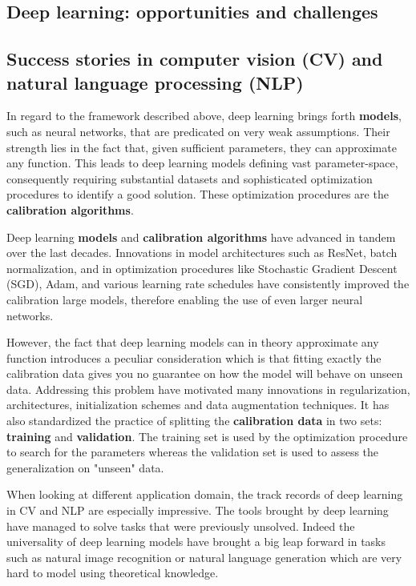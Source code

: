 \begin{bibunit}
% 

\section{Deep learning: opportunities and challenges}

\subsection{Success stories in computer vision (CV) and natural language processing (NLP)}

In regard to the framework described above, deep learning brings forth \textbf{models}, such as neural networks, that are predicated on very weak assumptions. Their strength lies in the fact that, given sufficient parameters, they can approximate any function\cite{}. This leads to deep learning models defining vast parameter-space, consequently requiring substantial datasets and sophisticated optimization procedures to identify a good solution. These optimization procedures are the \textbf{calibration algorithms}.

Deep learning \textbf{models} and \textbf{calibration algorithms} have advanced in tandem over the last decades.
Innovations in model architectures such as ResNet\cite{}, batch normalization\cite{}, and in optimization procedures\cite{} like Stochastic Gradient Descent (SGD)\cite{}, Adam\cite{}, and various learning rate schedules have consistently improved the calibration large models, therefore enabling the use of even larger neural networks. 

However, the fact that deep learning models can in theory approximate any function introduces a peculiar consideration which is that fitting exactly the calibration data gives you no guarantee on how the model will behave on unseen data.
Addressing this problem have motivated many innovations in regularization, architectures, initialization schemes and data augmentation techniques.
It has also standardized the practice of splitting the \textbf{calibration data} in two sets: \textbf{training} and \textbf{validation}.
The training set is used by the optimization procedure to search for the parameters whereas the validation set is used to assess the generalization on "unseen" data.

When looking at different application domain, the track records of deep learning in CV\cite{} and NLP\cite{} are especially impressive. 
The tools brought by deep learning have managed to solve tasks that were previously unsolved.
Indeed the universality of deep learning models have brought a big leap forward in tasks such as natural image recognition or natural language generation which are very hard to model using theoretical knowledge.


\end{bibunit}
